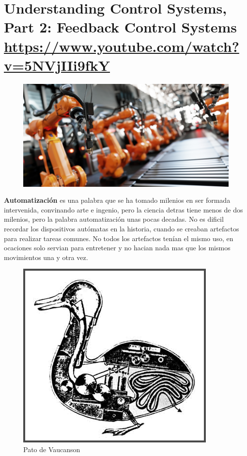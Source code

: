 \documentclass[
	12pt, %
]{fphw}
\begin{document}
\newpage
\section*{{\color{Cerulean}Understanding Control Systems, Part 2: Feedback Control Systems} \url{https://www.youtube.com/watch?v=5NVjIIi9fkY}}

\begin{figure}[H]
  \centering
  \includegraphics[scale=0.3]{images/automation.jpg}
\end{figure}


\textbf{Automatización} es una palabra que se ha tomado milenios en ser formada intervenida, convinando arte e ingenio, pero la ciencia detras tiene menos de dos milenios, pero la palabra automatización unas pocas decadas. No es dificil recordar los dispositivos autómatas en la historia, cuando se creaban artefactos para realizar tareas comunes. No todos los artefactos tenían el mismo uso, en ocaciones solo servian para entretener y no hacian nada mas que los mismos movimientos una y otra vez.

\begin{figure}[H]
  \centering
  \includegraphics[scale=0.6]{images/pato.jpg}
  \caption{Pato de Vaucanson}
\end{figure}
\end{document}
